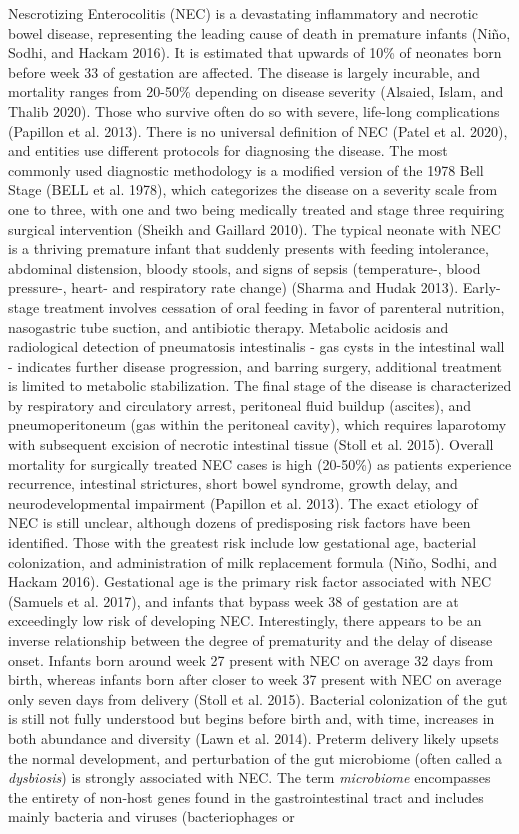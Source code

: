 \documentclass[
]{article}
\begin{document}
Nescrotizing Enterocolitis (NEC) is a devastating inflammatory and necrotic bowel disease, representing the leading cause of death in premature infants (Niño, Sodhi, and Hackam 2016). It is estimated that upwards of 10\% of neonates born before week 33 of gestation are affected. The disease is largely incurable, and mortality ranges from 20-50\% depending on disease severity (Alsaied, Islam, and Thalib 2020). Those who survive often do so with severe, life-long complications (Papillon et al. 2013). There is no universal definition of NEC (Patel et al. 2020), and entities use different protocols for diagnosing the disease. The most commonly used diagnostic methodology is a modified version of the 1978 Bell Stage (BELL et al. 1978), which categorizes the disease on a severity scale from one to three, with one and two being medically treated and stage three requiring surgical intervention (Sheikh and Gaillard 2010). The typical neonate with NEC is a thriving premature infant that suddenly presents with feeding intolerance, abdominal distension, bloody stools, and signs of sepsis (temperature-, blood pressure-, heart- and respiratory rate change) (Sharma and Hudak 2013). Early-stage treatment involves cessation of oral feeding in favor of parenteral nutrition, nasogastric tube suction, and antibiotic therapy. Metabolic acidosis and radiological detection of pneumatosis intestinalis - gas cysts in the intestinal wall - indicates further disease progression, and barring surgery, additional treatment is limited to metabolic stabilization. The final stage of the disease is characterized by respiratory and circulatory arrest, peritoneal fluid buildup (ascites), and pneumoperitoneum (gas within the peritoneal cavity), which requires laparotomy with subsequent excision of necrotic intestinal tissue (Stoll et al. 2015). Overall mortality for surgically treated NEC cases is high (20-50\%) as patients experience recurrence, intestinal strictures, short bowel syndrome, growth delay, and neurodevelopmental impairment (Papillon et al. 2013). The exact etiology of NEC is still unclear, although dozens of predisposing risk factors have been identified. Those with the greatest risk include low gestational age, bacterial colonization, and administration of milk replacement formula (Niño, Sodhi, and Hackam 2016). Gestational age is the primary risk factor associated with NEC (Samuels et al. 2017), and infants that bypass week 38 of gestation are at exceedingly low risk of developing NEC. Interestingly, there appears to be an inverse relationship between the degree of prematurity and the delay of disease onset. Infants born around week 27 present with NEC on average 32 days from birth, whereas infants born after closer to week 37 present with NEC on average only seven days from delivery (Stoll et al. 2015). Bacterial colonization of the gut is still not fully understood but begins before birth and, with time, increases in both abundance and diversity (Lawn et al. 2014). Preterm delivery likely upsets the normal development, and perturbation of the gut microbiome (often called a \emph{dysbiosis}) is strongly associated with NEC. The term \emph{microbiome} encompasses the entirety of non-host genes found in the gastrointestinal tract and includes mainly bacteria and viruses (bacteriophages or 
\end{document}
